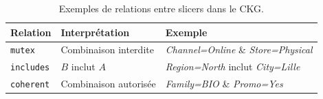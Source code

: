 \begin{table}[!t]
\centering
\caption{Exemples de relations entre slicers dans le CKG.}
\begin{tabular}{@{}lll@{}}
\toprule
Relation & Interprétation & Exemple \\
\midrule
\texttt{mutex} & Combinaison interdite & \textit{Channel=Online} \& \textit{Store=Physical} \\
\texttt{includes} & $B$ inclut $A$ & \textit{Region=North} inclut \textit{City=Lille} \\
\texttt{coherent} & Combinaison autorisée & \textit{Family=BIO} \& \textit{Promo=Yes} \\
\bottomrule
\end{tabular}
\label{tab:slicers}
\end{table}
